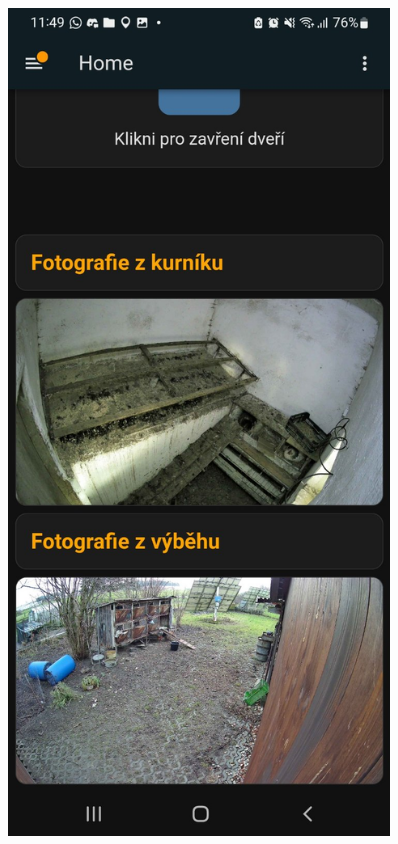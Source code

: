 \begin{figure}[H]
    \begin{minipage}[t]{0.5\textwidth}
        \centering
        \includegraphics[width=0.9\textwidth]{img/mobilni_apka2}
        \label{fig:mobilni_apka2}
    \end{minipage}
\end{figure}

